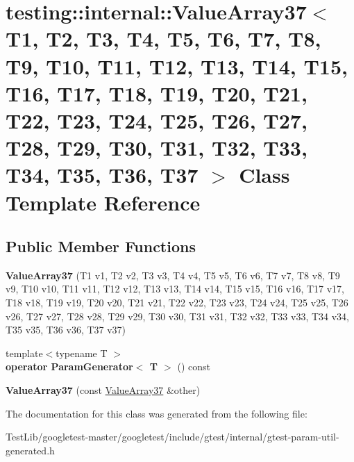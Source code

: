 \hypertarget{classtesting_1_1internal_1_1ValueArray37}{}\section{testing\+:\+:internal\+:\+:Value\+Array37$<$ T1, T2, T3, T4, T5, T6, T7, T8, T9, T10, T11, T12, T13, T14, T15, T16, T17, T18, T19, T20, T21, T22, T23, T24, T25, T26, T27, T28, T29, T30, T31, T32, T33, T34, T35, T36, T37 $>$ Class Template Reference}
\label{classtesting_1_1internal_1_1ValueArray37}
\subsection*{Public Member Functions}
\begin{DoxyCompactItemize}
\item 
\mbox{\label{classtesting_1_1internal_1_1ValueArray37_a23995196360c1ad375399601811ecdf3}} 
{\bfseries Value\+Array37} (T1 v1, T2 v2, T3 v3, T4 v4, T5 v5, T6 v6, T7 v7, T8 v8, T9 v9, T10 v10, T11 v11, T12 v12, T13 v13, T14 v14, T15 v15, T16 v16, T17 v17, T18 v18, T19 v19, T20 v20, T21 v21, T22 v22, T23 v23, T24 v24, T25 v25, T26 v26, T27 v27, T28 v28, T29 v29, T30 v30, T31 v31, T32 v32, T33 v33, T34 v34, T35 v35, T36 v36, T37 v37)
\item 
\mbox{\label{classtesting_1_1internal_1_1ValueArray37_ad8727a9cbc7746044e44009b1eb85abe}} 
{\footnotesize template$<$typename T $>$ }\\{\bfseries operator Param\+Generator$<$ T $>$} () const
\item 
\mbox{\label{classtesting_1_1internal_1_1ValueArray37_af41d8ae1459a62badbf7937975c11e2a}} 
{\bfseries Value\+Array37} (const \hyperlink{classtesting_1_1internal_1_1ValueArray37}{Value\+Array37} \&other)
\end{DoxyCompactItemize}


The documentation for this class was generated from the following file\+:\begin{DoxyCompactItemize}
\item 
Test\+Lib/googletest-\/master/googletest/include/gtest/internal/gtest-\/param-\/util-\/generated.\+h\end{DoxyCompactItemize}

